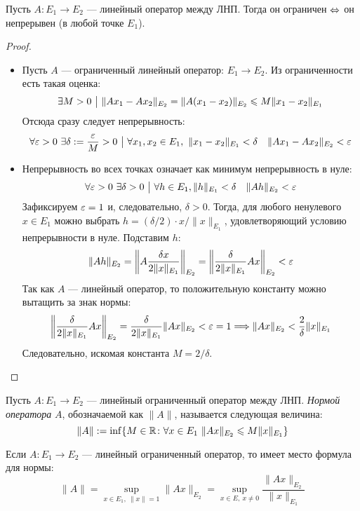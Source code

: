 \begin{proposition}
	Пусть $A \colon E_1 \to E_2$ --- линейный оператор между ЛНП. Тогда он ограничен $\Leftrightarrow$ он непрерывен (в любой точке $E_1$).
\end{proposition}

\begin{proof}~
    \begin{itemize}
        \item Пусть $A$ --- ограниченный линейный оператор: $E_1 \to E_2$. Из ограниченности есть такая оценка:
        \[
            \exists M > 0 \ \big|\  \|Ax_1 - Ax_2\|_{E_2} = \|A(x_1 - x_2)\|_{E_2} \leqslant M\|x_1 - x_2\|_{E_1}
        \]
        Отсюда сразу следует непрерывность:
        \[
            \forall \eps > 0\ \exists \delta := \frac{\eps}{M} > 0 \such \forall x_1, x_2 \in E_1,\  \|x_1 - x_2\|_{E_1} < \delta \quad \|Ax_1 - Ax_2\|_{E_2} < \eps
        \]
        
        \item Непрерывность во всех точках означает как минимум непрерывность в нуле:
        \[
            \forall \varepsilon > 0\ \exists \delta > 0 \ \big|\  \forall h \in E_1, \|h\|_{E_1} < \delta \quad \|Ah\|_{E_2} < \varepsilon
        \] 
        Зафиксируем $\varepsilon = 1$ и, следовательно, $\delta > 0$. Тогда, для любого ненулевого $x \in E_1$ можно выбрать $h = (\delta / 2) \cdot x / \|x\|_{E_1}$, удовлетворяющий условию непрерывности в нуле. Подставим $h$:
        \[
        	\|Ah\|_{E_2} = \left\|A \frac{\delta x}{2\|x\|_{E_1}}\right\|_{E_2} = \left\|\frac{\delta}{2\|x\|_{E_1}}Ax\right\|_{E_2} < \varepsilon
        \]
        Так как $A$ --- линейный оператор, то положительную константу можно вытащить за знак нормы:
        \[
              \left\|\frac{\delta}{2\|x\|_{E_1}}Ax\right\|_{E_2} = \frac{\delta}{2\|x\|_{E_1}}\|Ax\|_{E_2} < \varepsilon = 1 \Longrightarrow \|Ax\|_{E_2} < \frac{2}{\delta}\|x\|_{E_1}
        \]
        Следовательно, искомая константа $M = 2 / \delta$.
    \end{itemize}
\end{proof}

\begin{definition}
    Пусть $A \colon E_1 \to E_2$ --- линейный ограниченный оператор между ЛНП. \textit{Нормой оператора} $A$, обозначаемой как $\|A\|$, называется следующая величина:
    \[
    	\|A\| := \inf \{M \in \mathbb{R} \colon \forall x \in E_1\ \|Ax\|_{E_2} \leqslant M\|x\|_{E_1}\}
    \]
\end{definition}

\begin{proposition}
    Если $A \colon E_1 \to E_2$ --- линейный ограниченный оператор, то имеет место формула для нормы:
    \[
        \|A\| = \sup_{x \in E_1,\ \|x\| = 1} \|Ax\|_{E_2} = \sup_{x \in E,\ x \neq 0} \frac{\|Ax\|_{E_2}}{\|x\|_{E_1}} 
    \]
\end{proposition}

